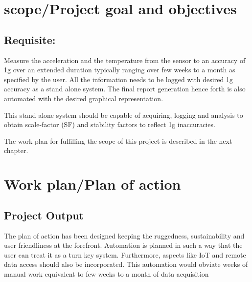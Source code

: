 \documentclass{FR16}
\begin{document}
\newpage
\section{scope/Project goal and objectives}
\subsection{Requisite:}
Measure the acceleration and the temperature from the  sensor to an accuracy of 1\textmu g over an extended duration typically ranging over few weeks to a month as specified by the user. All the information needs to be logged with desired 1\textmu g accuracy as a stand alone system.  The final report generation hence forth is also automated with the desired graphical representation. 

This stand alone system should be capable of acquiring, logging and analysis to obtain scale-factor (SF) and stability factors to reflect 1\textmu g inaccuracies. 


The work plan for fulfilling the scope of this project is described in the next chapter.      
\newpage


\section{Work plan/Plan of action}
\subsection{Project Output}
The plan of action has been designed keeping the ruggedness, sustainability and user friendliness at the forefront. Automation is planned in such a way that the user can treat it as a turn key system. Furthermore, aspects like  IoT and remote data access should also be incorporated. This automation would obviate weeks of manual work equivalent to few weeks to a month of data acquisition
\end{document}
